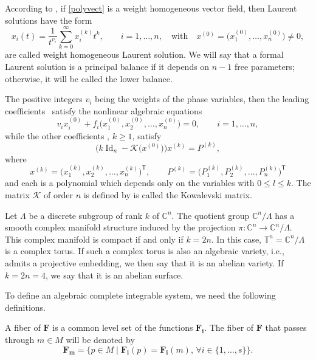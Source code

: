 \documentclass[pdftex]{sigma}
\numberwithin{equation}{section}
\begin{document}
According to \cite[Proposition 7.6]{al_Moer3}, if \eqref{polyvect}
is a weight homogeneous vector field, then Laurent solutions have the
form
\[x_i(t)=\frac{1}{t^{v_i}}\sum_{k=0}^\infty x_i^{(k)}t^k,
\qquad i=1,\dots,n,
\quad \text{with} \quad x^{(0)}=\bigl(x_1^{(0)},\dots,x_n^{(0)}\bigr)\neq0,\]
 are called weight homogeneous Laurent solution. We will say that a formal Laurent solution is a principal
balance if it depends on $n-1$ free parameters; otherwise, it will
be called the lower balance.

The positive integers $v_i$ being the weights of the phase
variables, then the leading coef\-ficients~
satisfy the nonlinear algebraic equations
\begin{equation}\label{equaindicial}
 v_ix_i^{(0)}+f_i\bigl(x_1^{(0)},x_2^{(0)},\dots,x_n^{( 0)}\bigr)=0, \qquad i=1,\dots,n,
\end{equation}
while the other coefficients ,
$k\geq1$, satisfy
\[\bigl(k\operatorname{Id}_n-\mathcal{K}\bigl(x^{(
0)}\bigr)\bigr)x^{(k)}=P^{(k)},\]
 where
 \[x^{(k)}=\bigl(x_1^{(k)},x_2^{(k)},\dots,x_n^{(
k)}\bigr)^{\mathsf{T}},
\qquad P^{(k)}=\bigl(P_1^{(k)},P_2^{(k)},\dots,P_n^{(
k)}\bigr)^{\mathsf{T}}
\]
and each  is a polynomial which depends only on the variables  with ${0\leq l\leq k}$. The matrix
$\mathcal{K}$ of order $n$ is defined by
 is called the Kowalevski matrix.

 Let $\Lambda$ be a discrete subgroup of rank $k$ of
$\mathbb{C}^n$. The quotient group $\mathbb{C}^n/ \Lambda$ has a
smooth complex manifold structure induced by the projection
$\pi\colon \mathbb{C}^n\longrightarrow \mathbb{C}^n/ \Lambda$. This
complex manifold is compact if and only if $k=2n$. In this case,
$\mathbb{T}^n=\mathbb{C}^n/ \Lambda$ is a complex torus. If such a
complex torus is also an algebraic variety, i.e., admits a projective
embedding, we then say that it is an abelian variety. If $k=2n=4$,
we say that it is an abelian surface.

To define an algebraic complete integrable system, we need the
following definitions.

\begin{Definition} A fiber of $\mathbf{F}$ is a common level set of the functions
$\mathbf{F_i}$. The fiber of $\mathbf{F}$ that passes through
$m\in M$ will be denoted by \[\mathbf{F_m}=\{p\in
M\mid \mathbf{F_i}(p)=\mathbf{F_i}(m),\, \forall i
\in \{1,\dots,s\}\}.\]
\end{Definition}
\end{document}
